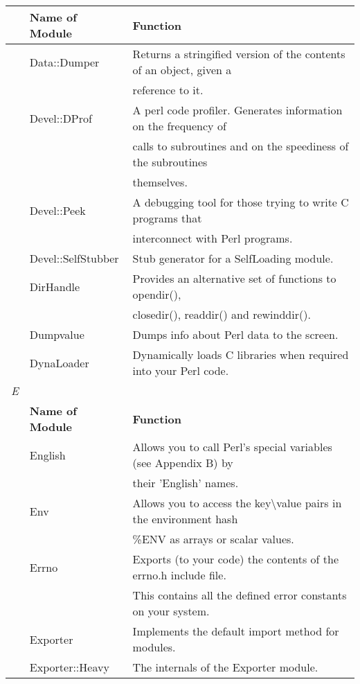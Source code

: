 \documentclass[a4paper,11pt]{book}
\begin{document}
\noindent 

\begin{tabular}{|p{0.3in}|p{1.2in}|p{2.7in}|} \hline 
 & \textbf{Name of Module} & \textbf{Function} \\ \hline 
 & Data::Dumper & Returns a stringified version of the contents of an object, given a \\ \hline 
 &  & reference to it. \\ \hline 
 & Devel::DProf & A perl code profiler. Generates information on the frequency of \\ \hline 
 &  & calls to subroutines and on the speediness of the subroutines \\ \hline 
 &  & themselves. \\ \hline 
 & Devel::Peek & A debugging tool for those trying to write C programs that \\ \hline 
 &  & interconnect with Perl programs. \\ \hline 
 & Devel::SelfStubber & Stub generator for a SelfLoading module. \\ \hline 
 & DirHandle & Provides an alternative set of functions to opendir(), \\ \hline 
 &  & closedir(), readdir() and rewinddir(). \\ \hline 
 & Dumpvalue & Dumps info about Perl data to the screen. \\ \hline 
 & DynaLoader & Dynamically loads C libraries when required into your Perl code. \\ \hline 
\newline \textit{E} &  &  \\ \hline 
 & \textbf{Name of Module} & \textbf{Function} \\ \hline 
 & English & Allows you to call Perl's special variables (see Appendix B) by \\ \hline 
 &  & their 'English' names. \\ \hline 
 & Env & Allows you to access the key\textbackslash value pairs in the environment hash \\ \hline 
 &  & \%ENV as arrays or scalar values. \\ \hline 
 & Errno & Exports (to your code) the contents of the errno.h include file. \\ \hline 
 &  & This contains all the defined error constants on your system. \\ \hline 
 & Exporter & Implements the default import method for modules. \\ \hline 
 & Exporter::Heavy & The internals of the Exporter module. \\ \hline 

\end{tabular}
\end{document}
